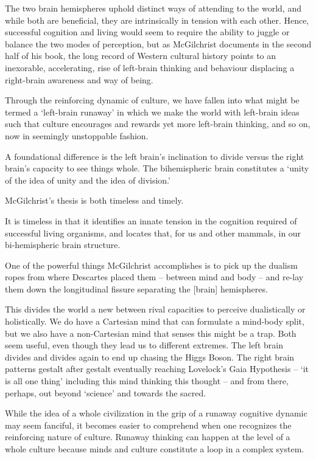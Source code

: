 \documentclass[
]{book}
\begin{document}
The two brain hemispheres uphold distinct ways of attending to the world, and while both are beneficial, they are intrinsically in tension with each other. Hence, successful cognition and living would seem to require the ability to juggle or balance the two modes of perception, but as McGilchrist documents in the second half of his book, the long record of Western cultural history points to an inexorable, accelerating, rise of left-brain thinking and behaviour displacing a right-brain awareness and way of being.

Through the reinforcing dynamic of culture, we have fallen into what might be termed a `left-brain runaway' in which we make the world with left-brain ideas such that culture encourages and rewards yet more left-brain thinking, and so on, now in seemingly unstoppable fashion.

A foundational difference is the left brain's inclination to divide versus the right brain's capacity to see things whole. The bihemispheric brain constitutes a `unity of the idea of unity and the idea of division.'

McGilchrist's thesis is both timeless and timely.

It is timeless in that it identifies an innate tension in the cognition required of successful living organisms, and locates that, for us and other mammals, in our bi-hemispheric brain structure.

One of the powerful things McGilchrist accomplishes is to pick up the dualism ropes from where Descartes placed them -- between mind and body -- and re-lay them down the longitudinal fissure separating the {[}brain{]} hemispheres.

This divides the world a new between rival capacities to perceive dualistically or holistically. We do have a Cartesian mind that can formulate a mind-body split, but we also have a non-Cartesian mind that senses this might be a trap. Both seem useful, even though they lead us to different extremes. The left brain divides and divides again to end up chasing the Higgs Boson. The right brain patterns gestalt after gestalt eventually reaching Lovelock's Gaia Hypothesis -- `it is all one thing' including this mind thinking this thought -- and from there, perhaps, out beyond `science' and towards the sacred.

While the idea of a whole civilization in the grip of a runaway cognitive dynamic may seem fanciful, it becomes easier to comprehend when one recognizes the reinforcing nature of culture. Runaway thinking can happen at the level of a whole culture because minds and culture constitute a loop in a complex system.
\end{document}
